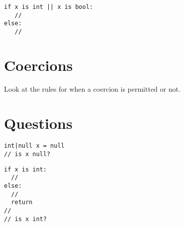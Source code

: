 \begin{lstlisting}
if x is int || x is bool:
   //
else:
   //
\end{lstlisting}

\section{Coercions}
Look at the rules for when a coercion is permitted or not.

\section{Questions}

\begin{lstlisting}
int|null x = null
// is x null?
\end{lstlisting}

\begin{lstlisting}
if x is int:
  //
else:
  //
  return
//
// is x int?
\end{lstlisting}